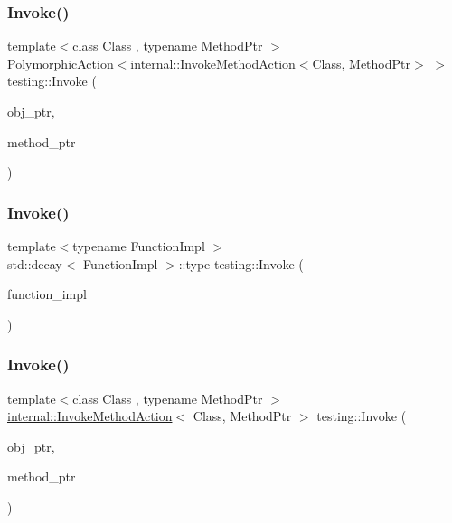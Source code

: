 \mbox{\label{namespacetesting_a80b82dc382445d240ff011f9c34aefc4}} 
\subsubsection{\texorpdfstring{Invoke()}{Invoke()}\hspace{0.1cm}{\footnotesize\ttfamily [2/4]}}
{\footnotesize\ttfamily template$<$class Class , typename Method\+Ptr $>$ \\
\mbox{\hyperlink{classtesting_1_1_polymorphic_action}{Polymorphic\+Action}}$<$\mbox{\hyperlink{structtesting_1_1internal_1_1_invoke_method_action}{internal\+::\+Invoke\+Method\+Action}}$<$Class, Method\+Ptr$>$ $>$ testing\+::\+Invoke (\begin{DoxyParamCaption}\item[{Class $\ast$}]{obj\+\_\+ptr,  }\item[{Method\+Ptr}]{method\+\_\+ptr }\end{DoxyParamCaption})}

\mbox{\label{namespacetesting_af5cacf4475557b5a3e37af3836564235}} 
\subsubsection{\texorpdfstring{Invoke()}{Invoke()}\hspace{0.1cm}{\footnotesize\ttfamily [3/4]}}
{\footnotesize\ttfamily template$<$typename Function\+Impl $>$ \\
std\+::decay$<$ Function\+Impl $>$\+::type testing\+::\+Invoke (\begin{DoxyParamCaption}\item[{Function\+Impl \&\&}]{function\+\_\+impl }\end{DoxyParamCaption})}

\mbox{\label{namespacetesting_af6a7c9befa6ff00198434995586151c3}} 
\subsubsection{\texorpdfstring{Invoke()}{Invoke()}\hspace{0.1cm}{\footnotesize\ttfamily [4/4]}}
{\footnotesize\ttfamily template$<$class Class , typename Method\+Ptr $>$ \\
\mbox{\hyperlink{structtesting_1_1internal_1_1_invoke_method_action}{internal\+::\+Invoke\+Method\+Action}}$<$ Class, Method\+Ptr $>$ testing\+::\+Invoke (\begin{DoxyParamCaption}\item[{Class $\ast$}]{obj\+\_\+ptr,  }\item[{Method\+Ptr}]{method\+\_\+ptr }\end{DoxyParamCaption})}

